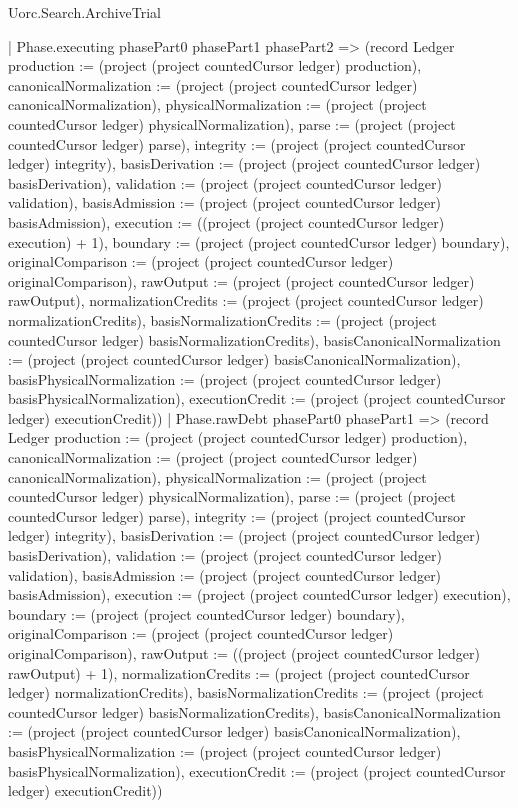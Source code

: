 \begin{lexlean}{Uorc.Search.ArchiveTrial}
\begin{semanticmodule}
{{    | Phase.executing phasePart0 phasePart1 phasePart2 => (record Ledger {production := (project (project countedCursor ledger) production), canonicalNormalization := (project (project countedCursor ledger) canonicalNormalization), physicalNormalization := (project (project countedCursor ledger) physicalNormalization), parse := (project (project countedCursor ledger) parse), integrity := (project (project countedCursor ledger) integrity), basisDerivation := (project (project countedCursor ledger) basisDerivation), validation := (project (project countedCursor ledger) validation), basisAdmission := (project (project countedCursor ledger) basisAdmission), execution := ((project (project countedCursor ledger) execution) + 1), boundary := (project (project countedCursor ledger) boundary), originalComparison := (project (project countedCursor ledger) originalComparison), rawOutput := (project (project countedCursor ledger) rawOutput), normalizationCredits := (project (project countedCursor ledger) normalizationCredits), basisNormalizationCredits := (project (project countedCursor ledger) basisNormalizationCredits), basisCanonicalNormalization := (project (project countedCursor ledger) basisCanonicalNormalization), basisPhysicalNormalization := (project (project countedCursor ledger) basisPhysicalNormalization), executionCredit := (project (project countedCursor ledger) executionCredit)})
    | Phase.rawDebt phasePart0 phasePart1 => (record Ledger {production := (project (project countedCursor ledger) production), canonicalNormalization := (project (project countedCursor ledger) canonicalNormalization), physicalNormalization := (project (project countedCursor ledger) physicalNormalization), parse := (project (project countedCursor ledger) parse), integrity := (project (project countedCursor ledger) integrity), basisDerivation := (project (project countedCursor ledger) basisDerivation), validation := (project (project countedCursor ledger) validation), basisAdmission := (project (project countedCursor ledger) basisAdmission), execution := (project (project countedCursor ledger) execution), boundary := (project (project countedCursor ledger) boundary), originalComparison := (project (project countedCursor ledger) originalComparison), rawOutput := ((project (project countedCursor ledger) rawOutput) + 1), normalizationCredits := (project (project countedCursor ledger) normalizationCredits), basisNormalizationCredits := (project (project countedCursor ledger) basisNormalizationCredits), basisCanonicalNormalization := (project (project countedCursor ledger) basisCanonicalNormalization), basisPhysicalNormalization := (project (project countedCursor ledger) basisPhysicalNormalization), executionCredit := (project (project countedCursor ledger) executionCredit)})
}}
\end{semanticmodule}
\end{lexlean}
